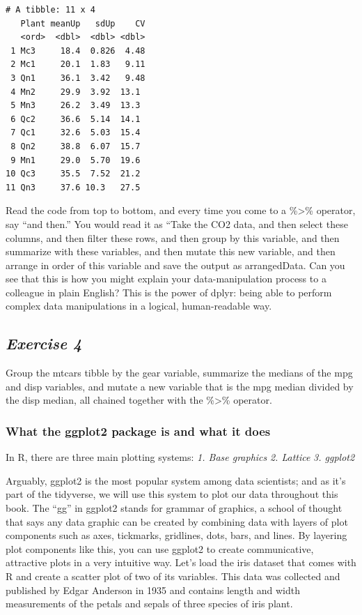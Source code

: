 \documentclass[
]{article}
\begin{document}
\begin{verbatim}
# A tibble: 11 x 4
   Plant meanUp   sdUp    CV
   <ord>  <dbl>  <dbl> <dbl>
 1 Mc3     18.4  0.826  4.48
 2 Mc1     20.1  1.83   9.11
 3 Qn1     36.1  3.42   9.48
 4 Mn2     29.9  3.92  13.1 
 5 Mn3     26.2  3.49  13.3 
 6 Qc2     36.6  5.14  14.1 
 7 Qc1     32.6  5.03  15.4 
 8 Qn2     38.8  6.07  15.7 
 9 Mn1     29.0  5.70  19.6 
10 Qc3     35.5  7.52  21.2 
11 Qn3     37.6 10.3   27.5 
\end{verbatim}

Read the code from top to bottom, and every time you come to a
\%\textgreater\% operator, say ``and then.'' You would read it as ``Take
the CO2 data, and then select these columns, and then filter these rows,
and then group by this variable, and then summarize with these
variables, and then mutate this new variable, and then arrange in order
of this variable and save the output as arrangedData. Can you see that
this is how you might explain your data-manipulation process to a
colleague in plain English? This is the power of dplyr: being able to
perform complex data manipulations in a logical, human-readable way.

\subsection{\texorpdfstring{\emph{Exercise
4}}{Exercise 4}}\label{exercise-4}

Group the mtcars tibble by the gear variable, summarize the medians of
the mpg and disp variables, and mutate a new variable that is the mpg
median divided by the disp median, all chained together with the
\%\textgreater\% operator.

\subsubsection{What the ggplot2 package is and what it
does}\label{what-the-ggplot2-package-is-and-what-it-does}

In R, there are three main plotting systems: \emph{1. Base graphics}
\emph{2. Lattice} \emph{3. ggplot2}

Arguably, ggplot2 is the most popular system among data scientists; and
as it's part of the tidyverse, we will use this system to plot our data
throughout this book. The ``gg'' in ggplot2 stands for grammar of
graphics, a school of thought that says any data graphic can be created
by combining data with layers of plot components such as axes,
tickmarks, gridlines, dots, bars, and lines. By layering plot components
like this, you can use ggplot2 to create communicative, attractive plots
in a very intuitive way. Let's load the iris dataset that comes with R
and create a scatter plot of two of its variables. This data was
collected and published by Edgar Anderson in 1935 and contains length
and width measurements of the petals and sepals of three species of iris
plant.
\end{document}
